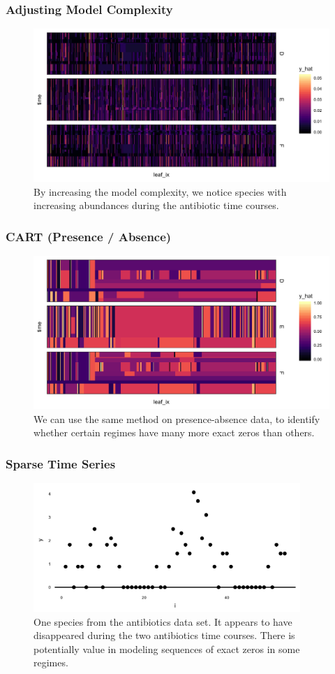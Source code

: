 \documentclass{beamer}
\begin{document}
\begin{frame}
  \frametitle{Adjusting Model Complexity}
  \begin{figure}[ht]
    \centering
    \includegraphics[width=.8\textwidth]{figure/rpart_simple}
    \caption{By increasing the model complexity, we notice species with
      increasing abundances during the antibiotic time
      courses. \label{fig:rpart_simple} }
  \end{figure}
\end{frame}

\begin{frame}
  \frametitle{CART (Presence / Absence)}
  \begin{figure}[ht]
    \centering
    \includegraphics[width=.8\textwidth]{figure/rpart_binary}
    \caption{We can use the same method on presence-absence data, to identify
      whether certain regimes have many more exact zeros than others.
      \label{fig:rpart_binary} }
  \end{figure}
\end{frame}

\begin{frame}
  \frametitle{Sparse Time Series}
\begin{figure}[ht]
  \centering
  \includegraphics[width=0.9\textwidth]{figure/abt_zeros}
  \caption{One species from the antibiotics data set. It appears to have
    disappeared during the two antibiotics time courses. There is potentially
    value in modeling sequences of exact zeros in some regimes.
    \label{fig:abt_zeros} }
\end{figure}
\end{frame}
\end{document}
